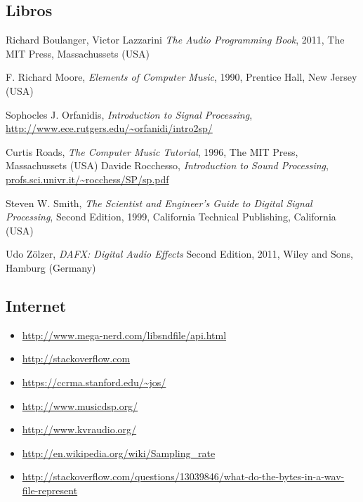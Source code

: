 \documentclass[a4paper,spanish,12pt]{article}
\begin{document}
\subsection{Libros}
\begin{thebibliography}{9}
  Richard Boulanger, Victor Lazzarini
  \emph{The Audio Programming Book},
  2011, The MIT Press, Massachussets (USA)
 
  F. Richard Moore,
  \emph{Elements of Computer Music},
  1990, Prentice Hall, New Jersey (USA)

  Sophocles J. Orfanidis,
  \emph{Introduction to Signal Processing}, \\
  \url{http://www.ece.rutgers.edu/~orfanidi/intro2sp/}
  
  Curtis Roads,
  \emph{The Computer Music Tutorial},
  1996, The MIT Press, Massachussets (USA)
  Davide Rocchesso,
  \emph{Introduction to Sound Processing},
  \url{profs.sci.univr.it/~rocchess/SP/sp.pdf}
  
  Steven W. Smith,
  \emph{The Scientist and Engineer's Guide to Digital Signal Processing},
  Second Edition, 1999, California Technical Publishing, California (USA)
  
  Udo Zölzer,
  \emph{DAFX: Digital Audio Effects}
  Second Edition, 2011, Wiley and Sons, Hamburg (Germany)
\end{thebibliography}
  
\subsection{Internet}

\begin{itemize}
\item \url{http://www.mega-nerd.com/libsndfile/api.html}
\item \url{http://stackoverflow.com}
\item \url{https://ccrma.stanford.edu/~jos/}
\item \url{http://www.musicdsp.org/}
\item \url{http://www.kvraudio.org/}
\item \url{http://en.wikipedia.org/wiki/Sampling_rate}
\item \url{http://stackoverflow.com/questions/13039846/what-do-the-bytes-in-a-wav-file-represent}

\end{itemize}
\end{document}
